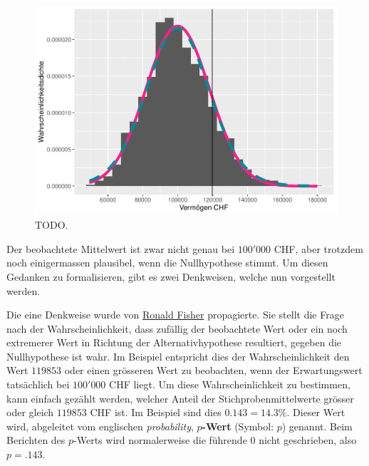 \documentclass[
]{book}
\theoremstyle{definition}
\theoremstyle{definition}
\theoremstyle{definition}
\theoremstyle{definition}
\theoremstyle{remark}
\begin{document}
\begin{figure}

{\centering \includegraphics{aps_statistik1_files/figure-latex/exm-vermoegen-histogram-plot-1} 

}

\caption{TODO.}\label{fig:exm-vermoegen-histogram-plot}
\end{figure}

Der beobachtete Mittelwert ist zwar nicht genau bei \(100'000\) CHF, aber trotzdem noch einigermassen plausibel, wenn die Nullhypothese stimmt. Um diesen Gedanken zu formalisieren, gibt es zwei Denkweisen, welche nun vorgestellt werden.

Die eine Denkweise wurde von \href{https://en.wikipedia.org/wiki/Ronald_Fisher}{Ronald Fisher} propagierte. Sie stellt die Frage nach der Wahrscheinlichkeit, dass zufällig der beobachtete Wert oder ein noch extremerer Wert in Richtung der Alternativhypothese resultiert, gegeben die Nullhypothese ist wahr. Im Beispiel entspricht dies der Wahrscheinlichkeit den Wert \(119853\) oder einen grösseren Wert zu beobachten, wenn der Erwartungswert tatsächlich bei \(100'000\) CHF liegt. Um diese Wahrscheinlichkeit zu bestimmen, kann einfach gezählt werden, welcher Anteil der Stichprobenmittelwerte grösser oder gleich \(119853\) CHF ist. Im Beispiel sind dies \(0.143 = 14.3\%\). \label{customdef-pwert}{Dieser Wert wird, abgeleitet vom englischen \emph{probability}, \textbf{\(p\)-Wert} (Symbol: \(p\)) genannt. Beim Berichten des \(p\)-Werts wird normalerweise die führende \(0\) nicht geschrieben, also \(p = .143\).}
\end{document}
